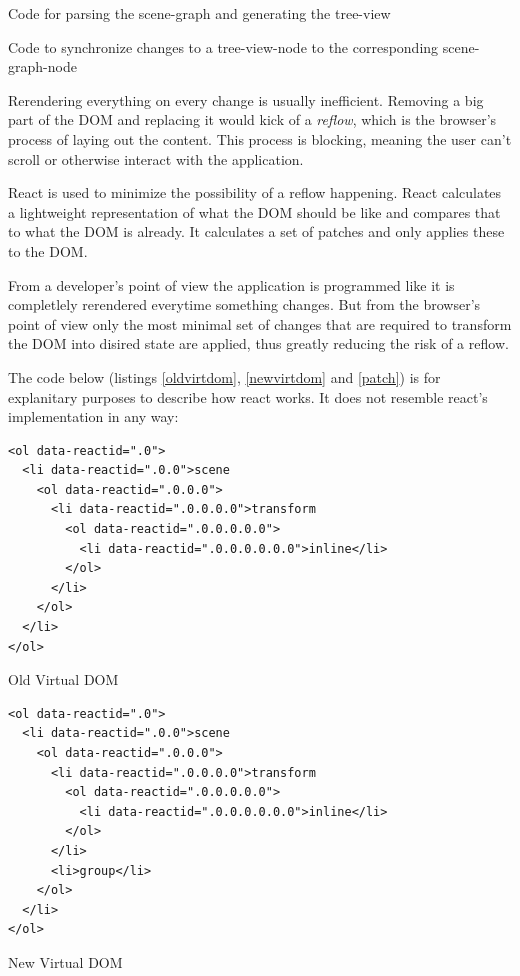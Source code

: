 \begin{enumerate*}
  \item Code for parsing the scene-graph and generating the tree-view
  \item Code to synchronize changes to a tree-view-node to the corresponding scene-graph-node
\end{enumerate*}

Rerendering everything on every change is usually inefficient. Removing a big part
of the \gls{DOM} and replacing it would kick of a \emph{reflow}, which is the browser's
process of laying out the content. This process is blocking, meaning the user can't
scroll or otherwise interact with the application. \cite{reflow}

React is used to minimize the possibility of a reflow happening. React
calculates a lightweight representation of what the \gls{DOM} should be like and
compares that to what the \gls{DOM} is already. It calculates a set of patches and
only applies these to the \gls{DOM}.

From a developer's point of view the application is programmed like it is
completlely rerendered everytime something changes. But from the browser's point
of view only the most minimal set of changes that are required to transform the
\gls{DOM} into disired state are applied, thus greatly reducing the risk of a reflow.

The code below (listings \ref{oldvirtdom}, \ref{newvirtdom} and \ref{patch}) is
for explanitary purposes to describe how react works. It does not resemble
react's implementation in any way:

\begin{listing}[H]
  \begin{verbatim}
<ol data-reactid=".0">
  <li data-reactid=".0.0">scene
    <ol data-reactid=".0.0.0">
      <li data-reactid=".0.0.0.0">transform
        <ol data-reactid=".0.0.0.0.0">
          <li data-reactid=".0.0.0.0.0.0">inline</li>
        </ol>
      </li>
    </ol>
  </li>
</ol>
  \end{verbatim}
  \caption{Old Virtual DOM}
  \label{oldvirtdom}
\end{listing}

\begin{listing}[H]
  \begin{verbatim}
<ol data-reactid=".0">
  <li data-reactid=".0.0">scene
    <ol data-reactid=".0.0.0">
      <li data-reactid=".0.0.0.0">transform
        <ol data-reactid=".0.0.0.0.0">
          <li data-reactid=".0.0.0.0.0.0">inline</li>
        </ol>
      </li>
      <li>group</li>
    </ol>
  </li>
</ol>
  \end{verbatim}
  \caption{New Virtual DOM}
  \label{newvirtdom}
\end{listing}

